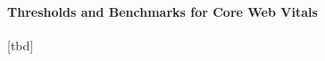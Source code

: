 







\paragraph{Thresholds and Benchmarks for Core Web Vitals}


[tbd]





















































